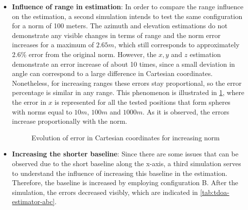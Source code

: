 \begin{itemize}
	\item \textbf{Influence of range in estimation}: In order to compare the range influence on the estimation, a second simulation intends to test the same configuration for a norm of 100 meters. The azimuth and elevation estimations do not demonstrate any visible changes in terms of range and the norm error increases for a maximum of $2.65m$, which still corresponds to approximately 2.6\% error from the original norm. However, the $x, y$ and $z$ estimation demonstrate an error increase of about 10 times, since a small deviation in angle can correspond to a large difference in Cartesian coordinates. Nonetheless, for increasing ranges these errors stay proportional, so the error percentage is similar in any range. This phenomenon is illustrated in \ref{fig:cart-range}, where the error in $x$ is represented for all the tested positions that form spheres with norms equal to $10 m$, $100 m$ and $1000 m$. As it is observed, the errors increase proportionally with the norm.
	
	\begin{figure}[!htbp]
		\captionsetup{justification=centering,margin=2cm}
		\caption{Evolution of error in Cartesian coordinates for increasing norm}
		\label{fig:cart-range}
	\end{figure}
	
	\item \textbf{Increasing the shorter baseline}: Since there are some issues that can be observed due to the short baseline along the x-axis, a third simulation serves to understand the influence of increasing this baseline in the estimation. Therefore, the baseline is increased by employing configuration B. After the simulation, the errors decreased visibly, which are indicated in \ref{tab:tdoa-estimator-abc}.
\end{itemize}

